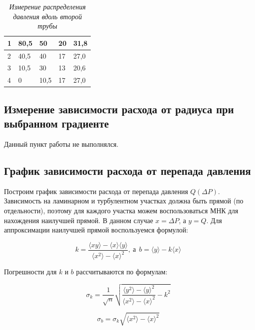 \documentclass[a4paper,12pt]{article}
\begin{document}
\begin{table}[!ht]
    \centering
    \begin{tabular}{|l|l|l|l|l|}
    \hline
        1 & 80,5 & 50 & 20 & 31,8 \\ \hline
        2 & 40,5 & 40 & 17 & 27,0 \\ \hline
        3 & 10,5 & 30 & 13 & 20,6 \\ \hline
        4 & 0 & 10,5 & 17 & 27,0 \\ \hline
    \end{tabular}\caption{\textit{Измерение распределения давления вдоль второй трубы}}\label{table:p-2}
\end{table}

\clearpage

\subsection{Измерение зависимости расхода от радиуса при выбранном градиенте}

Данный пункт работы не выполнялся.

\subsection{График зависимости расхода от перепада давления}

Построим график зависимости расхода от перепада давления $Q(\Delta P)$. Зависимость на ламинарном и турбулентном участках должна быть прямой (по отдельности), поэтому для каждого участка можем воспользоваться МНК для нахождения наилучшей прямой. В данном случае $x = \Delta P$, а $y = Q$. Для аппроксимации наилучшей прямой воспользуемся формулой:

\begin{equation}\label{eq:mnk}
    k = \frac{\langle xy\rangle - \langle x \rangle \langle y \rangle}{\langle x^2 \rangle - \langle x \rangle^2},
    \ \text{а} \ \  b = \langle y \rangle - k\langle x \rangle
\end{equation}

Погрешности для $k$ и $b$ рассчитываются по формулам:

\begin{equation}
    \sigma_k = \frac{1}{\sqrt{n}} \sqrt{\frac{\langle y^2 \rangle - \langle y \rangle^2}{\langle x^2 \rangle - \langle x \rangle^2} - k^2}
\end{equation}

\begin{equation}
    \sigma_b = \sigma_k\sqrt{\langle x^2 \rangle - \langle x \rangle^2}
\end{equation}
\end{document}
